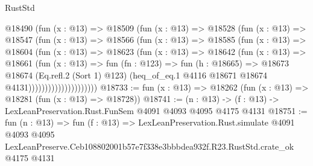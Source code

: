 \begin{lexlean}{RustStd}
\begin{coremodule}
                      @18490
                        (fun (x : @13) =>
                        @18509
                          (fun (x : @13) =>
                          @18528
                            (fun (x : @13) =>
                            @18547
                              (fun (x : @13) =>
                              @18566
                                (fun (x : @13) =>
                                @18585
                                  (fun (x : @13) =>
                                  @18604
                                    (fun (x : @13) =>
                                    @18623
                                      (fun (x : @13) =>
                                      @18642
                                        (fun (x : @13) =>
                                        @18661
                                          (fun (x : @13) =>
                                          fun (fn : @123) =>
                                          fun (h : @18665) =>
                                          @18673
                                            @18674
                                            (Eq.refl.{2} (Sort 1) @123)
                                            (heq_of_eq.{1}
                                              @4116
                                              @18671
                                              @18674
                                              @4131)))))))))))))))))))))
@18733 := fun (x : @13) => @18262 (fun (x : @13) => @18281 (fun (x : @13) => @18728))
@18741 := (n : @13) -> (f : @13) -> LexLeanPreservation.Rust.FunSem @4091 @4093 @4095 @4175 @4131
@18751 := fun (n : @13) =>
  fun (f : @13) =>
  LexLeanPreservation.Rust.simulate
    @4091
    @4093
    @4095
    LexLeanPreserve.Ceb108802001b57e7f338e3bbbdea932f.R23.RustStd.crate_ok
    @4175
    @4131
\end{coremodule}
\end{lexlean}
